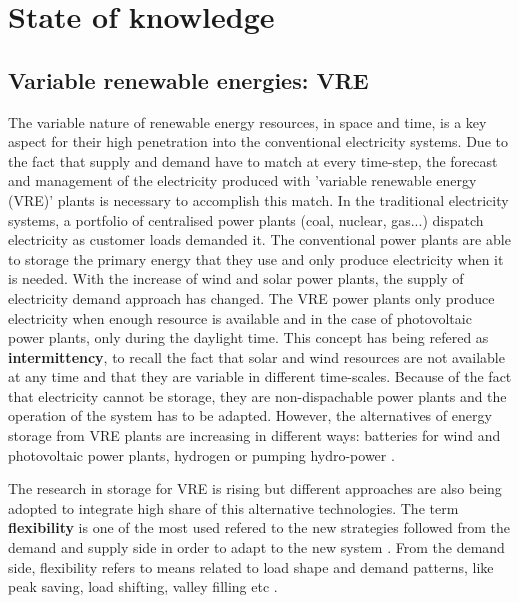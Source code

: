 
\chapter{State of knowledge\label{cha:state}}


\section{Variable renewable energies: VRE}

The variable nature of renewable energy resources, in space and time, is a key aspect for their high penetration into the conventional electricity systems. Due to the fact that supply and demand have to match at every time-step, the forecast and management of the electricity produced with 'variable renewable energy (VRE)' plants is necessary to accomplish this match. In the traditional electricity systems, a portfolio of centralised power plants (coal, nuclear, gas...) dispatch electricity as customer loads demanded it. The conventional power plants are able to storage the primary energy that they use and only produce electricity when it is needed. With the increase of wind and solar power plants, the supply of electricity demand approach has changed. The VRE power plants only produce electricity when enough resource is available and in the case of photovoltaic power plants, only during the daylight time. This concept has being refered as \textbf{intermittency}, to recall the fact that solar and wind resources are not available at any time and that they are variable in different time-scales. Because of the fact that electricity cannot be storage, they are non-dispachable power plants and the operation of the system has to be adapted. However, the alternatives of energy storage from VRE plants are increasing in different ways: batteries for wind and photovoltaic power plants, hydrogen or pumping hydro-power \cite*{Lund2015, Blanco2018, Schaber2004}.

The research in storage for VRE is rising but different approaches are also being adopted to integrate high share of this alternative technologies. The term \textbf{flexibility} is one of the most used refered to the new strategies followed from the demand and supply side in order to adapt to the new system \cite*{KROPOSKI2017}. From the demand side, flexibility refers to means related to load shape and demand patterns, like peak saving, load shifting, valley filling etc \cite*{Lund2015}.


